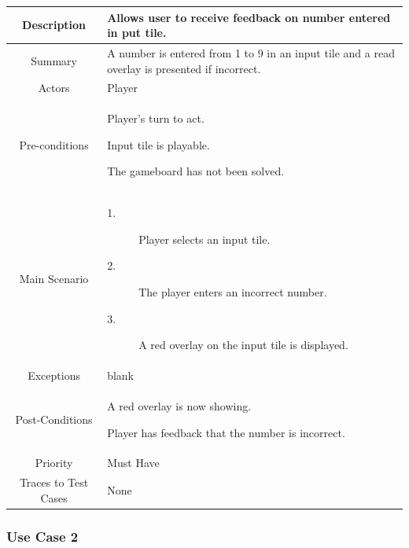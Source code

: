 \documentclass[12pt]{article}
\begin{document}
\begin{table}[htbp]
\begin{center}
\begin{tabular}{| c | m{10cm} |}
\hline
\cellcolor{lightgray}Description & Allows user to receive feedback on number entered in put tile. \\
\hline
\cellcolor{lightgray}Summary & A number is entered from 1 to 9 in an input tile and a read overlay is presented if incorrect. \\
\hline
\cellcolor{lightgray}Actors & Player \\
\hline
\cellcolor{lightgray}Pre-conditions &
\begin{description}[font=$\bullet$~\normalfont\scshape]
\item Player's turn to act.
\item Input tile is playable. 
\item The gameboard has not been solved.
\end{description}\\
\hline
\cellcolor{lightgray}Main Scenario & 
\begin{description}
\item [1.]Player selects an input tile.
\item [2.]The player enters an incorrect number. 
\item [3.]A red overlay on the input tile is displayed.
\end{description}\\
\hline
\cellcolor{lightgray}Exceptions & blank \\
\hline
\cellcolor{lightgray}Post-Conditions & 
\begin{description}[font=$\bullet$~\normalfont\scshape]
\item A red overlay is now showing.
\item Player has feedback that the number is incorrect.
\end{description}\\
\hline
\cellcolor{lightgray}Priority & Must Have \\
\hline
\cellcolor{lightgray}Traces to Test Cases & None \\
\hline
\end{tabular}
\end{center}
\end{table}

\clearpage

\subsubsection{Use Case 2} \label{uc:2}
\end{document}
